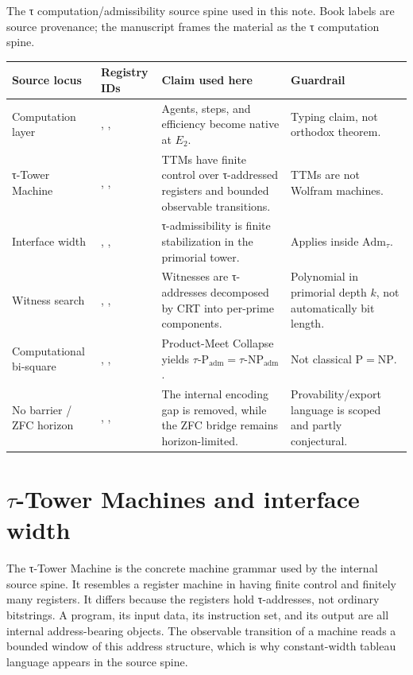 \documentclass{pantarhei-researchnote}
\newcommand{\Adm}{\ensuremath{\mathrm{Adm}_{\tau}}}
\newcommand{\Padm}{\ensuremath{\tau\text{-}\mathrm{P}_{\mathrm{adm}}}}
\newcommand{\NPadm}{\ensuremath{\tau\text{-}\mathrm{NP}_{\mathrm{adm}}}}
\newcommand{\Etwo}{\ensuremath{E_2}}
\newcommand{\ClassP}{\ensuremath{\mathrm{P}}}
\newcommand{\ClassNP}{\ensuremath{\mathrm{NP}}}
\begin{document}
\begin{widetable}[t]
\caption{The τ computation/admissibility source spine used in this note.
Book labels are source provenance; the manuscript frames the material as
the τ computation spine.}
\label{tab:tau-spine}
\prtablefont
\begin{tabularx}{\textwidth}{p{}p{}Y Y}
\toprule
\textbf{Source locus} & \textbf{Registry IDs} & \textbf{Claim used here} & \textbf{Guardrail} \\
\midrule
Computation layer & , , 
& Agents, steps, and efficiency become native at \Etwo. & Typing claim, not orthodox theorem. \\
τ-Tower Machine & , , 
& TTMs have finite control over τ-addressed registers and bounded observable transitions. & TTMs are not Wolfram machines. \\
Interface width & , , 
& τ-admissibility is finite stabilization in the primorial tower. & Applies inside \Adm. \\
Witness search & , , 
& Witnesses are τ-addresses decomposed by CRT into per-prime components. & Polynomial in primorial depth \(k\), not automatically bit length. \\
Computational bi-square & , , 
& Product-Meet Collapse yields \(\Padm=\NPadm\). & Not classical \(\ClassP=\ClassNP\). \\
No barrier / ZFC horizon & , , 
& The internal encoding gap is removed, while the ZFC bridge remains horizon-limited. & Provability/export language is scoped and partly conjectural. \\
\bottomrule
\end{tabularx}
\end{widetable}

\section{\texorpdfstring{$\tau$}{tau}-Tower Machines and interface width}
\label{sec:ttm-interface}

The τ-Tower Machine is the concrete machine grammar used by the internal
source spine. It resembles a register machine in having finite control and
finitely many registers. It differs because the registers hold
τ-addresses, not ordinary bitstrings. A program, its input data, its
instruction set, and its output are all internal address-bearing objects.
The observable transition of a machine reads a bounded window of this
address structure, which is why constant-width tableau language appears in
the source spine.
\end{document}
